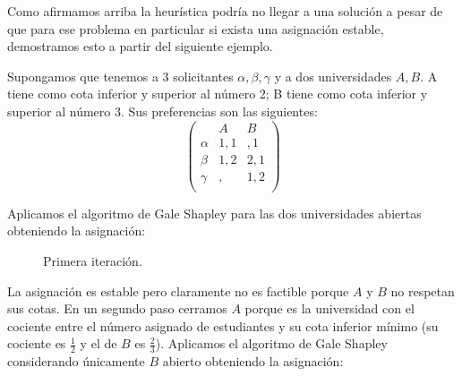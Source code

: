 Como afirmamos arriba la heurística podría no llegar a una solución a pesar de que para ese problema en particular si exista una asignación estable, demostramos esto a partir del siguiente ejemplo. 

\begin{eje} \cite{Todo}
Supongamos que tenemos a 3 solicitantes $\alpha,\beta,\gamma$ y a dos universidades $A,B$. A tiene como cota inferior y superior al número 2; B tiene como cota inferior y superior al número 3. Sus preferencias son las siguientes:
$$\begin{pmatrix}
& A & B \\
\alpha & 1,1 & ,1 \\
\beta & 1,2 & 2,1 \\ 
\gamma & , & 1,2 \\ 
\end{pmatrix}$$

Aplicamos el algoritmo de Gale Shapley para las dos universidades abiertas obteniendo la asignación:
\begin{figure}[H]\centering


\caption{Primera iteración.}
\end{figure}

La asignación es estable pero claramente no es factible porque $A$ y $B$ no respetan sus cotas. En un segundo paso cerramos $A$ porque es la universidad con el cociente entre el número asignado de estudiantes y su cota inferior mínimo (su cociente es $\frac{1}{2}$ y el de $B$ es $\frac{2}{3}$). Aplicamos el algoritmo de Gale Shapley considerando únicamente $B$ abierto obteniendo la asignación:


\end{eje}
